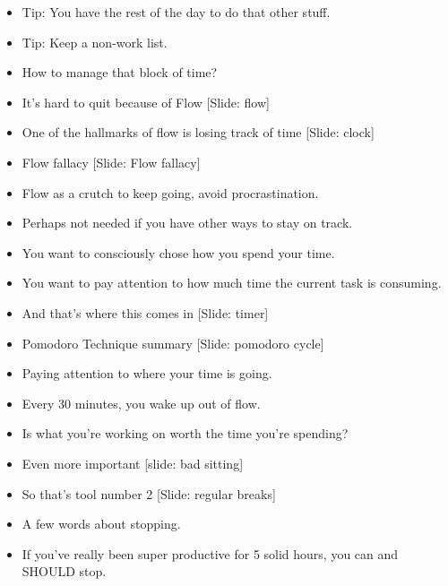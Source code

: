 \documentclass[12pt]{article}
\begin{document}
{\begin{itemize}
\item Tip:  You have the rest of the day to do that other stuff.

\item Tip:  Keep a non-work list.

\item How to manage that block of time?

\item It's hard to quit because of Flow [Slide: flow]

\item One of the hallmarks of flow is losing track of time [Slide: clock]

\item Flow fallacy [Slide: Flow fallacy]

\item Flow as a crutch to keep going, avoid procrastination.

\item Perhaps not needed if you have other ways to stay on track.

\item You want to consciously chose how you spend your time.

\item You want to pay attention to how much time the current task is consuming.

\item And that's where this comes in [Slide:  timer]

\item Pomodoro Technique summary [Slide: pomodoro cycle]

\item Paying attention to where your time is going.

\item Every 30 minutes, you wake up out of flow.

\item Is what you're working on worth the time you're spending?

\item Even more important [slide:  bad sitting]

\item So that's tool number 2 [Slide:  regular breaks]


\item A few words about stopping.  

\item If you've really been super productive for 5 solid hours, you can and SHOULD stop.


\end{itemize}}
\end{document}
